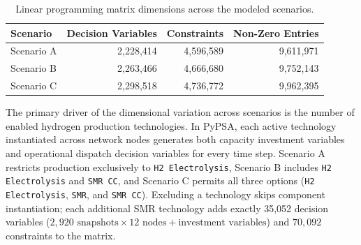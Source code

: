 \documentclass[preprint,12pt]{elsarticle}
\begin{document}
\begin{table}[htbp]
\centering
\caption{Linear programming matrix dimensions across the modeled scenarios.}
\label{tab:problem_dimensions}
\begin{tabular}{lrrr}
\toprule
{Scenario} & {Decision Variables} & {Constraints} & {Non-Zero Entries} \\ \midrule
Scenario A & 2,228,414 & 4,596,589 & 9,611,971 \\
Scenario B & 2,263,466 & 4,666,680 & 9,752,143 \\
Scenario C & 2,298,518 & 4,736,772 & 9,962,395 \\ \bottomrule
\end{tabular}
\end{table}

The primary driver of the dimensional variation across scenarios is the number of enabled hydrogen production technologies. In PyPSA, each active technology instantiated across network nodes generates both capacity investment variables and operational dispatch decision variables for every time step. Scenario A restricts production exclusively to \texttt{H2 Electrolysis}, Scenario B includes \texttt{H2 Electrolysis} and \texttt{SMR CC}, and Scenario C permits all three options (\texttt{H2 Electrolysis}, \texttt{SMR}, and \texttt{SMR CC}). Excluding a technology skips component instantiation; each additional SMR technology adds exactly 35,052 decision variables ($2,920 \text{ snapshots} \times 12 \text{ nodes} + \text{investment variables}$) and $70,092$ constraints to the matrix.




\end{document}
